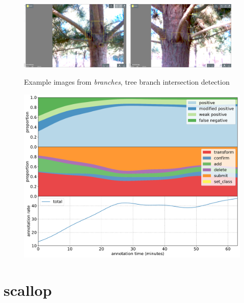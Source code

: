 \begin{figure}[!h]
  \includegraphics[width=0.475\textwidth]{figures/annotation/screenshots/branches3.png}
  \includegraphics[width=0.475\textwidth]{figures/annotation/screenshots/branches2.png}  
  
  \caption{Example images from \emph{branches}, tree branch intersection detection}
\end{figure}

\begin{figure}[!h]
\centering
\includegraphics[width=1.0\linewidth]{charts/action_annotations/branches.pdf}
\caption{  }
\label{fig:branches_annotation}
\end{figure}

\pagebreak
\section {scallop}

